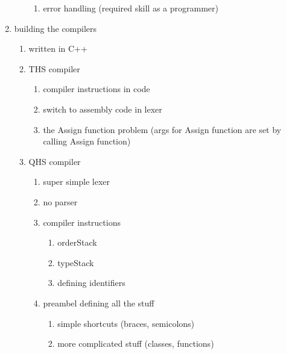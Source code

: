 \documentclass[parskip=full]{scrreprt}
\begin{document}
\begin{enumerate}
\begin{enumerate}
\begin{enumerate}
                            \item error handling (required skill as a programmer)
                        \end{enumerate}
              \end{enumerate}
        \item building the compilers
              \begin{enumerate}
                  \item written in C++
                  \item THS compiler
                        \begin{enumerate}
                            \item compiler instructions in code
                            \item switch to assembly code in lexer
                            \item the Assign function problem (args for Assign function are set by calling Assign function)
                        \end{enumerate}
                  \item QHS compiler
                        \begin{enumerate}
                            \item super simple lexer
                            \item no parser
                            \item compiler instructions
                                  \begin{enumerate}
                                      \item orderStack
                                      \item typeStack
                                      \item defining identifiers
                                  \end{enumerate}
                            \item preambel defining all the stuff
                                  \begin{enumerate}
                                      \item simple shortcuts (braces, semicolons)
                                      \item more complicated stuff (classes, functions)
                                  \end{enumerate}
                        \end{enumerate}
              \end{enumerate}
    \end{enumerate}
\fi









\listoffigures
\lstlistoflistings
\listoftables



\nocite{CompilersDragon}
\nocite{CodeGen:TableDriven}
\end{document}
